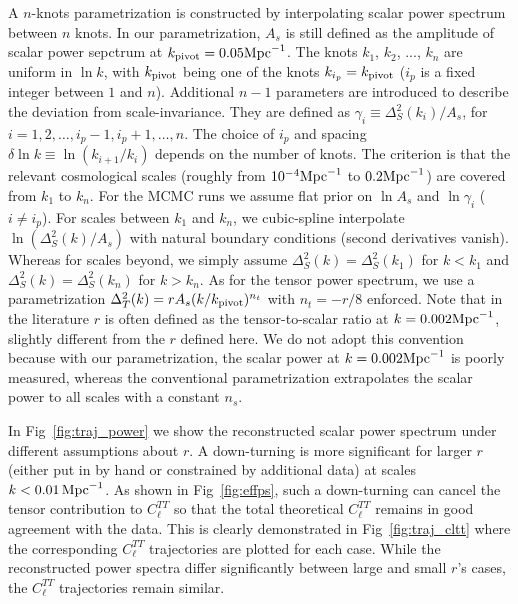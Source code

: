 \documentclass[11pt]{article}
\begin{document}
A $n$-knots parametrization is constructed by interpolating scalar power spectrum between $n$ knots. In our parametrization,  $A_s$ is still defined as the amplitude of scalar power sepctrum at $k_{\rm pivot}=0.05 {\rm Mpc}^{-1}$. The knots $k_1$, $k_2$, ..., $k_n$ are uniform in $\ln k$, with $k_{\rm pivot}$ being one of the knots $k_{i_p} = k_{\rm pivot}$ ($i_p$ is a fixed integer between $1$ and $n$). Additional $n-1$ parameters are introduced to describe the deviation from scale-invariance. They are defined as $\gamma_i\equiv \Delta^2_S(k_i)/ A_s$, for $i = 1, 2, \ldots, i_p - 1, i_p+1, \ldots, n$.  The choice of $i_p$ and spacing $\delta\ln k \equiv \ln (k_{i+1}/k_i)$ depends on the number of knots. The criterion is that the relevant cosmological scales (roughly from $10^{-4}{\rm Mpc}^{-1}$ to $0.2 {\rm Mpc}^{-1}$) are covered from $k_1$ to $k_n$. For the MCMC runs we assume flat prior on $\ln A_s$ and $\ln \gamma_i$ ($i\neq i_p$). For scales between $k_1$ and $k_n$, we cubic-spline interpolate $\ln (\Delta^2_S(k)/A_s)$ with natural boundary conditions (second derivatives vanish). Whereas for scales beyond, we simply assume $\Delta^2_S(k) = \Delta^2_S(k_1)$ for $k<k_1$ and $\Delta^2_S(k) = \Delta^2_S(k_n)$ for $k>k_n$. As for the tensor power spectrum, we use a parametrization $\Delta^2_T(k) = r A_s (k/k_{\rm pivot})^{n_t}$ with $n_t = -r/8$ enforced. Note that in the literature $r$ is often defined as the tensor-to-scalar ratio at $k=0.002 {\rm Mpc}^{-1}$, slightly different from the $r$ defined here. We do not adopt this convention because with our parametrization, the scalar power at $k=0.002 {\rm Mpc}^{-1}$ is poorly measured, whereas the conventional parametrization extrapolates the scalar power to all scales with a constant $n_s$.

In Fig~\ref{fig:traj_power} we show the reconstructed scalar power spectrum under different assumptions about $r$. A down-turning is more significant for larger $r$ (either put in by hand or constrained by additional data) at scales $k<0.01\,{\rm Mpc}^{-1}$. As shown in Fig~\ref{fig:effps}, such a down-turning can cancel the tensor contribution to $C_\ell^{TT}$ so that the total theoretical $C_\ell^{TT}$ remains in good agreement with the data. This is clearly demonstrated in Fig~\ref{fig:traj_cltt} where the corresponding $C_\ell^{TT}$ trajectories are plotted for each case. While the reconstructed power spectra differ significantly between large and small $r$'s cases, the $C_\ell^{TT}$ trajectories remain similar.
\end{document}
